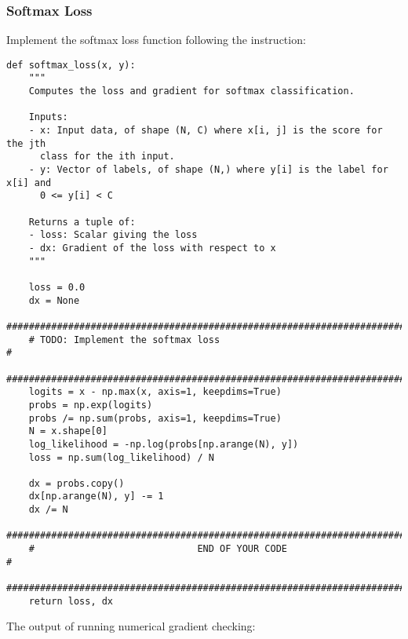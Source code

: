 \documentclass[a4paper,12pt]{article}
\begin{document}
\subsubsection{Softmax Loss}
Implement the softmax loss function following the instruction:
\begin{lstlisting}
def softmax_loss(x, y):
    """
    Computes the loss and gradient for softmax classification.

    Inputs:
    - x: Input data, of shape (N, C) where x[i, j] is the score for the jth
      class for the ith input.
    - y: Vector of labels, of shape (N,) where y[i] is the label for x[i] and
      0 <= y[i] < C

    Returns a tuple of:
    - loss: Scalar giving the loss
    - dx: Gradient of the loss with respect to x
    """

    loss = 0.0
    dx = None
    ###########################################################################
    # TODO: Implement the softmax loss                                        #
    ###########################################################################
    logits = x - np.max(x, axis=1, keepdims=True)
    probs = np.exp(logits)
    probs /= np.sum(probs, axis=1, keepdims=True)
    N = x.shape[0]
    log_likelihood = -np.log(probs[np.arange(N), y])
    loss = np.sum(log_likelihood) / N
    
    dx = probs.copy()
    dx[np.arange(N), y] -= 1
    dx /= N
    ###########################################################################
    #                             END OF YOUR CODE                            #
    ###########################################################################
    return loss, dx
\end{lstlisting}

The output of running numerical gradient checking:
\end{document}
